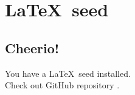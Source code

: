\section{\LaTeX\ seed} %
\label{sec:latex_seed}


\subsection{Cheerio!} %
\label{sub:cheerio_}

You have a \LaTeX\ seed installed.\\
Check out GitHub repository \cite{githubrepo}.



 